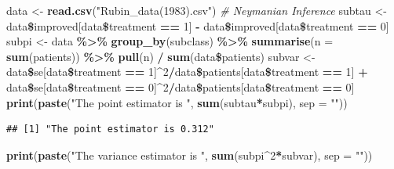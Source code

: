 \documentclass[]{article}
\newenvironment{Shaded}{\begin{snugshade}}{\end{snugshade}}
\newcommand{\KeywordTok}[1]{\textcolor[rgb]{0.13,0.29,0.53}{\textbf{#1}}}
\newcommand{\DataTypeTok}[1]{\textcolor[rgb]{0.13,0.29,0.53}{#1}}
\newcommand{\DecValTok}[1]{\textcolor[rgb]{0.00,0.00,0.81}{#1}}
\newcommand{\StringTok}[1]{\textcolor[rgb]{0.31,0.60,0.02}{#1}}
\newcommand{\CommentTok}[1]{\textcolor[rgb]{0.56,0.35,0.01}{\textit{#1}}}
\newcommand{\OperatorTok}[1]{\textcolor[rgb]{0.81,0.36,0.00}{\textbf{#1}}}
\newcommand{\NormalTok}[1]{#1}
\begin{document}
\begin{Shaded}
\begin{Highlighting}[]
\NormalTok{data <-}\StringTok{ }\KeywordTok{read.csv}\NormalTok{(}\StringTok{"Rubin_data(1983).csv"}\NormalTok{)}
\CommentTok{# Neymanian Inference}
\NormalTok{subtau <-}\StringTok{ }\NormalTok{data}\OperatorTok{\$}\NormalTok{improved[data}\OperatorTok{\$}\NormalTok{treatment }\OperatorTok{==}\StringTok{ }\DecValTok{1}\NormalTok{] }\OperatorTok{-}\StringTok{ }\NormalTok{data}\OperatorTok{\$}\NormalTok{improved[data}\OperatorTok{\$}\NormalTok{treatment }\OperatorTok{==}\StringTok{ }\DecValTok{0}\NormalTok{]}
\NormalTok{subpi <-}\StringTok{ }\NormalTok{data }\OperatorTok{\%>\%}\StringTok{ }\KeywordTok{group_by}\NormalTok{(subclass) }\OperatorTok{\%>\%}\StringTok{ }\KeywordTok{summarise}\NormalTok{(}\DataTypeTok{n =} \KeywordTok{sum}\NormalTok{(patients)) }\OperatorTok{\%>\%}\StringTok{ }\KeywordTok{pull}\NormalTok{(n) }\OperatorTok{/}\StringTok{ }\KeywordTok{sum}\NormalTok{(data}\OperatorTok{\$}\NormalTok{patients)}
\NormalTok{subvar <-}\StringTok{ }\NormalTok{data}\OperatorTok{\$}\NormalTok{se[data}\OperatorTok{\$}\NormalTok{treatment }\OperatorTok{==}\StringTok{ }\DecValTok{1}\NormalTok{]}\OperatorTok{^}\DecValTok{2}\OperatorTok{/}\NormalTok{data}\OperatorTok{\$}\NormalTok{patients[data}\OperatorTok{\$}\NormalTok{treatment }\OperatorTok{==}\StringTok{ }\DecValTok{1}\NormalTok{] }\OperatorTok{+}\StringTok{ }\NormalTok{data}\OperatorTok{\$}\NormalTok{se[data}\OperatorTok{\$}\NormalTok{treatment }\OperatorTok{==}\StringTok{ }\DecValTok{0}\NormalTok{]}\OperatorTok{^}\DecValTok{2}\OperatorTok{/}\NormalTok{data}\OperatorTok{\$}\NormalTok{patients[data}\OperatorTok{\$}\NormalTok{treatment }\OperatorTok{==}\StringTok{ }\DecValTok{0}\NormalTok{]}
\KeywordTok{print}\NormalTok{(}\KeywordTok{paste}\NormalTok{(}\StringTok{"The point estimator is "}\NormalTok{, }\KeywordTok{sum}\NormalTok{(subtau}\OperatorTok{*}\NormalTok{subpi), }\DataTypeTok{sep =} \StringTok{""}\NormalTok{))}
\end{Highlighting}
\end{Shaded}

\begin{verbatim}
## [1] "The point estimator is 0.312"
\end{verbatim}

\begin{Shaded}
\begin{Highlighting}[]
\KeywordTok{print}\NormalTok{(}\KeywordTok{paste}\NormalTok{(}\StringTok{"The variance estimator is "}\NormalTok{, }\KeywordTok{sum}\NormalTok{(subpi}\OperatorTok{^}\DecValTok{2}\OperatorTok{*}\NormalTok{subvar), }\DataTypeTok{sep =} \StringTok{""}\NormalTok{))}
\end{Highlighting}
\end{Shaded}
\end{document}
